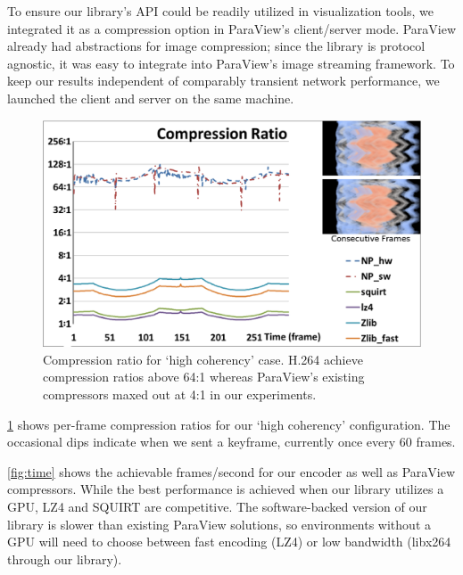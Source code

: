 \documentclass{vgtc}                          %
\begin{document}
To ensure our library's API could be readily utilized in visualization
tools, we integrated it as a compression option in ParaView's
client/server mode.  ParaView already had abstractions for image
compression; since the library is protocol agnostic, it was easy to
integrate into ParaView's image streaming framework.  To keep our
results independent of comparably transient network performance, we
launched the client and server on the same machine.


\begin{figure}[htb]
  \vspace{2.5mm}
  \centering
  \includegraphics[width=\columnwidth]{compressRatio.eps}
  \caption{Compression ratio for `high coherency' case.
	H.264 achieve compression ratios above 64:1 whereas ParaView's existing
	compressors maxed out at 4:1 in our experiments.}
  \label{fig:compressRatio}
\end{figure}

\cref{fig:compressRatio} shows per-frame compression ratios for our
`high coherency' configuration.  The occasional dips indicate when we
sent a keyframe, currently once every 60 frames.


\cref{fig:time} shows the achievable frames/second for our encoder as
well as ParaView compressors.  While the best performance is achieved
when our library utilizes a GPU, LZ4 and SQUIRT are competitive.  The
software-backed version of our library is slower than existing ParaView
solutions, so environments without a GPU will need to choose between
fast encoding (LZ4) or low bandwidth (libx264 through our library).
\end{document}
